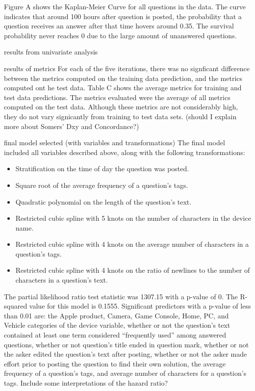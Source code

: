 \documentclass[12pt]{article}
\begin{document}
        Figure A shows the Kaplan-Meier Curve for all questions in the data. The curve indicates that around 100 hours after question is posted, the probability that a question receives an answer after that time hovers around 0.35. The survival probability never reaches 0 due to the large amount of unanswered questions. 

results from univariate analysis 

results of metrics 
        For each of the five iterations, there was no signficant difference between the metrics computed on the training data prediction, and the metrics computed ont he test data. Table C shows the average metrics for training and test data predictions. The metrics evaluated were the average of all metrics computed on the test data. Although these metrics are not considerably high, they do not vary signicantly from training to test data sets.  (should I explain more about Somers' Dxy and Concordance?) 

final model selected (with variables and transformations) 
The final model included all variables described above, along with the following transformations: 

\begin{itemize}
  \item Stratification on the time of day the question was posted. 
  \item Square root of the average frequency of a question's tags. 
  \item Quadratic polynomial on the length of the question's text. 
  \item Restricted cubic spline with 5 knots on the number of characters in the device name.
  \item Restricted cubic spline with 4 knots on the average number of characters in a question's tags.
  \item Restricted cubic spline with 4 knots on the ratio of newlines to the number of characters in a question's text. 
\end{itemize}
The partial likelihood ratio test statistic was 1307.15 with a p-value of 0. The R-squared value for this model is 0.1555. Significant predictors with a p-value of less than 0.01 are: the Apple product, Camera, Game Console, Home, PC, and Vehicle categories of the device variable, whether or not the question's text contained at least one term considered ``frequently used'' among answered questions, whether or not question's title ended in question mark, whether or not the asker edited the question's text after posting, whether or not the asker made effort prior to posting the question to find their own solution, the average frequency of a question's tags, and average number of characters for a question's tags. Include some interpretations of the hazard ratio? 
\end{document}
